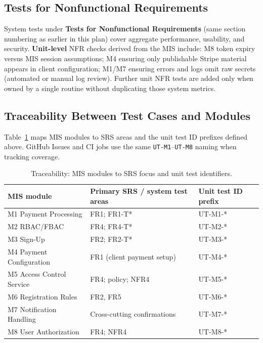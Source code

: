 \documentclass[12pt, titlepage]{article}
\begin{document}
\subsection{Tests for Nonfunctional Requirements}

System tests under \textbf{Tests for Nonfunctional Requirements} (same section numbering as earlier in this plan) cover aggregate performance, usability, and security. \textbf{Unit-level} NFR checks derived from the MIS include: M8 token expiry versus MIS session assumptions; M4 ensuring only publishable Stripe material appears in client configuration; M1/M7 ensuring errors and logs omit raw secrets (automated or manual log review). Further unit NFR tests are added only when owned by a single routine without duplicating those system metrics.

\subsection{Traceability Between Test Cases and Modules}

Table~\ref{tab:unit-trace} maps MIS modules to SRS areas and the unit test ID prefixes defined above. GitHub Issues and CI jobs use the same \texttt{UT-M1}--\texttt{UT-M8} naming when tracking coverage.

\begin{table}[H]
\centering
\renewcommand{\arraystretch}{1.15}
\begin{tabular}{|p{2.2cm}|p{4.5cm}|p{6.8cm}|}
\hline
\textbf{MIS module} & \textbf{Primary SRS / system test areas} & \textbf{Unit test ID prefix} \\ \hline
M1 Payment Processing & FR1; FR1-T* & UT-M1-* \\ \hline
M2 RBAC/FBAC & FR4; FR4-T* & UT-M2-* \\ \hline
M3 Sign-Up & FR2; FR2-T* & UT-M3-* \\ \hline
M4 Payment Configuration & FR1 (client payment setup) & UT-M4-* \\ \hline
M5 Access Control Service & FR4; policy; NFR4 & UT-M5-* \\ \hline
M6 Registration Rules & FR2, FR5 & UT-M6-* \\ \hline
M7 Notification Handling & Cross-cutting confirmations & UT-M7-* \\ \hline
M8 User Authorization & FR4; NFR4 & UT-M8-* \\ \hline
\end{tabular}
\caption{Traceability: MIS modules to SRS focus and unit test identifiers.}
\label{tab:unit-trace}
\end{table}
				
\end{document}
